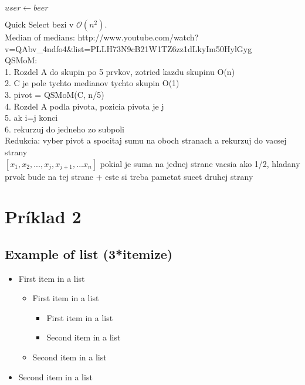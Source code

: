 \documentclass[paper=a4, fontsize=11pt]{scrartcl} %
\numberwithin{equation}{section} %
\numberwithin{figure}{section} %
\numberwithin{table}{section} %
\begin{document}
\begin{algorithmic}[5]
        \State $user \gets beer$
    \EndWhile
\end{algorithmic}

Quick Select bezi v $\mathcal{O}(n^2)$. \\
Median of medians: http://www.youtube.com/watch?v=QAbv\_4ndfo4\&list=PLLH73N9cB21W1TZ6zz1dLkyIm50HylGyg \\

QSMoM: \\
1. Rozdel A do skupin po 5 prvkov, zotried kazdu skupinu O(n) \\
2. C je pole tychto medianov tychto skupin O(1) \\
3. pivot = QSMoM(C, n/5) \\
4. Rozdel A podla pivota, pozicia pivota je j \\
5. ak i=j konci \\
6. rekurzuj do jedneho zo subpoli \\

Redukcia: vyber pivot a spocitaj sumu na oboch stranach a rekurzuj do vacsej strany \\
$[x_1, x_2, ... ,x_j, x_{j+1}, ... x_n]$
pokial je suma na jednej strane vacsia ako 1/2, hladany prvok bude na tej strane + este si treba pametat sucet druhej strany



\pagebreak

\section*{Príklad 2}

\subsection{Example of list (3*itemize)}
\begin{itemize}
	\item First item in a list 
		\begin{itemize}
		\item First item in a list 
			\begin{itemize}
			\item First item in a list 
			\item Second item in a list 
			\end{itemize}
		\item Second item in a list 
		\end{itemize}
	\item Second item in a list 
\end{itemize}
\end{document}
